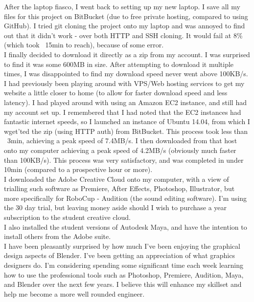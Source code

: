     		After the laptop fiasco, I went back to setting up my new laptop. I save all my files for this project on BitBucket (due to free private hosting, compared to using GitHub). I tried git cloning the project onto my laptop and was annoyed to find out that it didn't work - over both HTTP and SSH cloning. It would fail at 8\% (which took ~15min to reach), because of some error.\\
    		
    		I finally decided to download it directly as a zip from my  account. I was surprised to find it was some 600MB in size. After attempting to download it multiple times, I was disappointed to find my download speed never went above 100KB/s. I had previously been playing around with VPS/Web hosting services to get my website a little closer to home (to allow for faster download speed and less latency). I had played around with using an Amazon EC2 instance, and still had my account set up. I remembered that I had noted that the EC2 instances had fantastic internet speeds, so I launched an instance of Ubuntu 14.04, from which I wget'ted the zip (using HTTP auth) from BitBucket. This process took less than ~3min, achieving a peak speed of 7.4MB/s. I then downloaded from that host onto my computer achieving a peak speed of 4.2MB/s (obviously much faster than 100KB/s). This process was very satisfactory, and was completed in under 10min (compared to a prospective hour or more).\\
    		
    		I downloaded the Adobe Creative Cloud onto my computer, with a view of trialling such software as Premiere, After Effects, Photoshop, Illustrator, but more specifically for RoboCup - Audition (the sound editing software). I'm using the 30 day trial, but leaving money aside should I wish to purchase a year subscription to the student creative cloud.\\
    		
    		I also installed the student versions of Autodesk Maya, and have the intention to install others from the Adobe suite.\\
    		
    		I have been pleasantly surprised by how much I've been enjoying the graphical design aspects of Blender. I've been getting an appreciation of what graphics designers do. I'm considering spending some significant time each week learning how to use the professional tools such as Photoshop, Premiere, Audition, Maya, and Blender over the next few years. I believe this will enhance my skillset and help me become a more well rounded engineer.\\
    		
